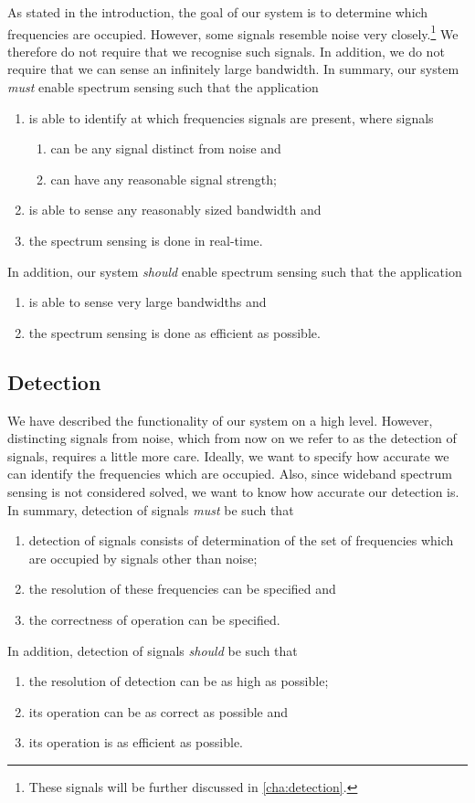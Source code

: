 \documentclass[a4paper, openany, oneside]{memoir}
\begin{document}
As stated in the introduction, the goal of our system is to determine which frequencies are occupied. However, some signals resemble noise very closely.\footnote{These signals will be further discussed in \cref{cha:detection}.} We therefore do not require that we recognise such signals. In addition, we do not require that we can sense an infinitely large bandwidth. In summary, our system \emph{must} enable spectrum sensing such that the application
\begin{enumerate}
    \item is able to identify at which frequencies signals are present, where signals
    \begin{enumerate}
        \item can be any signal distinct from noise and
        \item can have any reasonable signal strength;
    \end{enumerate}
    \item is able to sense any reasonably sized bandwidth and
    \item the spectrum sensing is done in real-time.
\end{enumerate}
In addition, our system \emph{should} enable spectrum sensing such that the application
\begin{enumerate}
    \item is able to sense very large bandwidths and
    \item the spectrum sensing is done as efficient as possible.
\end{enumerate}

\subsection{Detection}
We have described the functionality of our system on a high level. However, distincting signals from noise, which from now on we refer to as the detection of signals, requires a little more care. Ideally, we want to specify how accurate we can identify the frequencies which are occupied. Also, since wideband spectrum sensing is not considered solved, we want to know how accurate our detection is.
In summary, detection of signals \emph{must} be such that
\begin{enumerate}
    \item detection of signals consists of determination of the set of frequencies which are occupied by signals other than noise;
    \item the resolution of these frequencies can be specified and
    \item the correctness of operation can be specified.
\end{enumerate}
In addition, detection of signals \emph{should} be such that
\begin{enumerate}
    \item the resolution of detection can be as high as possible;
    \item its operation can be as correct as possible and
    \item its operation is as efficient as possible.
\end{enumerate}
\end{document}
